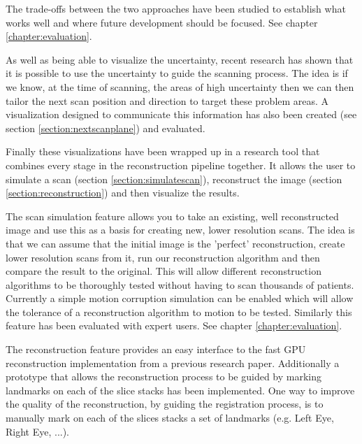 The trade-offs between the two approaches have been studied to establish what works well and where future development should be focused. See chapter \ref{chapter:evaluation}.

As well as being able to visualize the uncertainty, recent research\cite{uncertaintysvd} has shown that it is possible to use the uncertainty to guide the scanning process. The idea is if we know, at the time of scanning, the areas of high uncertainty then we can then tailor the next scan position and direction to target these problem areas. A visualization designed to communicate this information has also been created (see section \ref{section:nextscanplane}) and evaluated.

Finally these visualizations have been wrapped up in a research tool that combines every stage in the reconstruction pipeline together. It allows the user to simulate a scan (section \ref{section:simulatescan}), reconstruct the image (section \ref{section:reconstruction}) and then visualize the results.

The scan simulation feature allows you to take an existing, well reconstructed image and use this as a basis for creating new, lower resolution scans. The idea is that we can assume that the initial image is the 'perfect' reconstruction, create lower resolution scans from it, run our reconstruction algorithm and then compare the result to the original. This will allow different reconstruction algorithms to be thoroughly tested without having to scan thousands of patients. Currently a simple motion corruption simulation can be enabled which will allow the tolerance of a reconstruction algorithm to motion to be tested. Similarly this feature has been evaluated with expert users. See chapter \ref{chapter:evaluation}.

The reconstruction feature provides an easy interface to the fast GPU reconstruction implementation from a previous research paper\cite{gpureconstruction}. Additionally a prototype that allows the reconstruction process to be guided by marking landmarks on each of the slice stacks has been implemented. One way to improve the quality of the reconstruction, by guiding the registration process, is to manually mark on each of the slices stacks a set of landmarks (e.g. Left Eye, Right Eye, ...).